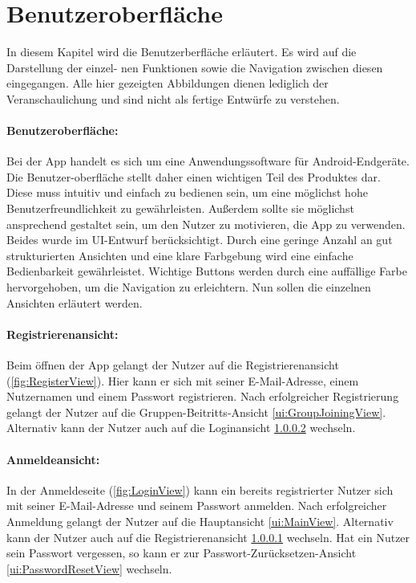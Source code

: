 \documentclass[parskip=full]{scrartcl}
\begin{document}
\section{Benutzeroberfläche}
\setcounter{secnumdepth}{6}
\renewcommand{\theparagraph}{$\langle$UI\arabic{paragraph}$\rangle$}

In diesem Kapitel wird die Benutzerberfläche erläutert. Es wird auf die Darstellung der einzel- nen Funktionen sowie die Navigation zwischen diesen eingegangen. Alle hier gezeigten Abbildungen dienen lediglich der Veranschaulichung und sind nicht als fertige Entwürfe zu verstehen.

\paragraph*{Benutzeroberfläche:}
Bei der App handelt es sich um eine Anwendungssoftware für Android-Endgeräte. Die Benutzer-oberfläche stellt daher einen wichtigen Teil des Produktes dar. Diese muss intuitiv und einfach zu bedienen sein, um eine möglichst hohe Benutzerfreundlichkeit zu gewährleisten. Außerdem sollte sie möglichst ansprechend gestaltet sein, um den Nutzer zu motivieren, die App zu verwenden. Beides wurde im UI-Entwurf berücksichtigt. Durch eine geringe Anzahl an gut strukturierten Ansichten und eine klare Farbgebung wird eine einfache Bedienbarkeit gewährleistet. Wichtige Buttons werden durch eine auffällige Farbe hervorgehoben, um die Navigation zu erleichtern. Nun sollen die einzelnen Ansichten erläutert werden.

\paragraph{Registrierenansicht:}
\label{ui:RegisterView}
Beim öffnen der App gelangt der Nutzer auf die Registrierenansicht (\autoref{fig:RegisterView}). Hier kann er sich mit seiner E-Mail-Adresse, einem Nutzernamen und einem Passwort registrieren. Nach erfolgreicher Registrierung gelangt der Nutzer auf die Gruppen-Beitritts-Ansicht \ref{ui:GroupJoiningView}. Alternativ kann der Nutzer auch auf die Loginansicht \ref{ui:LoginView} wechseln.

\paragraph{Anmeldeansicht:}
\label{ui:LoginView}
In der Anmeldeseite (\autoref{fig:LoginView}) kann ein bereits registrierter Nutzer sich mit seiner E-Mail-Adresse und seinem Passwort anmelden. Nach erfolgreicher Anmeldung gelangt der Nutzer auf die Hauptansicht \ref{ui:MainView}. Alternativ kann der Nutzer auch auf die Registrierenansicht \ref{ui:RegisterView} wechseln.
Hat ein Nutzer sein Passwort vergessen, so kann er zur Passwort-Zurücksetzen-Ansicht \ref{ui:PasswordResetView} wechseln.
\end{document}
